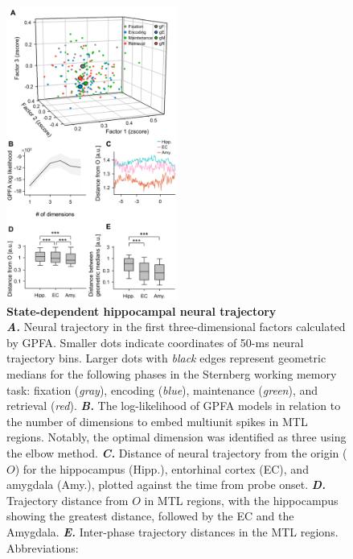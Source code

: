 \documentclass[final,3p,times,twocolumn]{elsarticle}
\begin{document}
        \begin{figure}[ht]
        	\centering
            \includegraphics[width=0.5\textwidth]{./src/figures/.png/Figure_ID_02.png}
        	\caption{\textbf{
State-dependent hippocampal neural trajectory
}
\smallskip
\\
\textbf{\textit{A.}} Neural trajectory in the first three-dimensional factors calculated by GPFA. Smaller dots indicate coordinates of 50-ms neural trajectory bins. Larger dots with \textit{black} edges represent geometric medians for the following phases in the Sternberg working memory task: fixation (\textit{gray}), encoding (\textit{blue}), maintenance (\textit{green}), and retrieval (\textit{red}). \textbf{\textit{B.}} The log-likelihood of GPFA models in relation to the number of dimensions to embed multiunit spikes in MTL regions. Notably, the optimal dimension was identified as three using the elbow method.  \textbf{\textit{C.}}  Distance of neural trajectory from the origin ($O$) for the hippocampus (Hipp.), entorhinal cortex (EC), and amygdala (Amy.), plotted against the time from probe onset. \textbf{\textit{D.}} Trajectory distance from $O$ in MTL regions, with the hippocampus showing the greatest distance, followed by the EC and the Amygdala. \textbf{\textit{E.}}  Inter-phase trajectory distances in the MTL regions.
Abbreviations:
}
        	\label{fig:02}
        \end{figure}
        \clearpage
\end{document}
